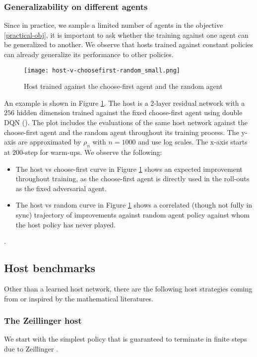 \documentclass{article}
\theoremstyle{plain}
\theoremstyle{definition}
\theoremstyle{remark}
\begin{document}
\subsubsection{Generalizability on different agents}
Since in practice, we sample a limited number of agents in the objective \eqref{practical-obj}, it is important to ask whether the training against one agent can be generalized to another.
We observe that hosts trained against constant policies can already generalize its performance to other policies.

\begin{figure}[ht!]
\centering
\texttt{[image: host-v-choosefirst-random\_small.png]} 
\caption{Host trained against the choose-first agent and the random agent} \label{host-choosefirst-random}
\end{figure}

An example is shown in Figure \ref{host-choosefirst-random}. The host is a 2-layer residual network with a $256$ hidden dimension trained against the fixed choose-first agent using double DQN (\cite{ddqn}). The plot includes the evaluations of the same host network against the choose-first agent and the random agent throughout its training process. The y-axis are approximated by $\rho_n$ with $n=1000$ and use log scales. The x-axis starts at $200$-step for warm-ups. We observe the following:
\begin{itemize}
    \item The host vs choose-first curve in Figure \ref{host-choosefirst-random} shows an expected improvement throughout training, as the choose-first agent is directly used in the roll-outs as the fixed adversarial agent.
    \item The host vs random curve in Figure \ref{host-choosefirst-random} shows a correlated (though not fully in sync) trajectory of improvements against random agent policy against whom the host policy has never played.
\end{itemize}
 . 

\subsection{Host benchmarks}
Other than a learned host network, there are the following host strategies coming from or inspired by the mathematical literatures.
\subsubsection{The Zeillinger host}\label{zeillinger-host}
We start with the simplest policy that is guaranteed to terminate in finite steps due to Zeillinger \cite{zeillinger}.
\end{document}

